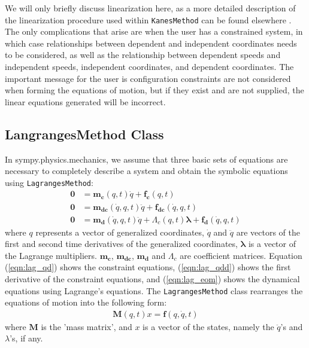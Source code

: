 \documentclass[twocolumn,10pt,final]{asme2e}
\begin{document}
We will only briefly discuss linearization here, as a more detailed description
of the linearization procedure used within \verb|KanesMethod| can be found
elsewhere \cite{Peterson2013}.  The only complications that arise are when the
user has a constrained system, in which case relationships between dependent
and independent coordinates needs to be considered, as well as the relationship
between dependent speeds and independent speeds, independent coordinates, and
dependent coordinates.  The important message for the user is
configuration constraints are not considered when forming the equations of
motion, but if they exist and are not supplied, the linear equations
generated will be incorrect.

\subsection*{LangrangesMethod Class}
In sympy.physics.mechanics, we assume that three basic sets of equations are
necessary to completely describe a system and obtain the symbolic equations
using \verb|LagrangesMethod|:
\begin{align}
    \mathbf{0} &= \mathbf{m_{c}}(q, t) \dot{q} + \mathbf{f_{c}}(q, t) \label{eqn:lag_qd}\\
    \mathbf{0} &= \mathbf{m_{dc}}(\dot{q}, q, t) \ddot{q} + \mathbf{f_{dc}}(\dot{q}, q,
        t) \label{eqn:lag_qdd}\\
    \mathbf{0} &= \mathbf{m_d}(\dot{q}, q, t) \ddot{q} + \Lambda_c(q, t)
        \mathbf{\lambda} + \mathbf{f_d}(\dot{q}, q, t) \label{eqn:lag_eom}
\end{align}
where $q$ represents a vector of generalized coordinates, $\dot{q}$ and
$\ddot{q}$ are vectors of the first and second time derivatives of the
generalized coordinates, $\mathbf{\lambda}$ is a vector of the Lagrange
multipliers. $\mathbf{m_c}$, $\mathbf{m_{dc}}$, $\mathbf{m_d}$ and
$\Lambda_c$ are coefficient matrices.
Equation (\ref{eqn:lag_qd}) shows the constraint equations,
(\ref{eqn:lag_qdd}) shows the
first derivative of the constraint equations, and (\ref{eqn:lag_eom}) shows
the dynamical equations using Lagrange's equations. The
\verb|LagrangesMethod| class rearranges the equations of motion into the
following form:
\label{eqn:lag_rearr}
\begin{align}
    \mathbf{M}(q, t) x = \mathbf{f}(q, \dot{q}, t)
\end{align}
where $\mathbf{M}$ is the 'mass matrix', and $x$ is a vector of the states,
namely the $\ddot{q}$'s and $\lambda$'s, if any.
\end{document}
